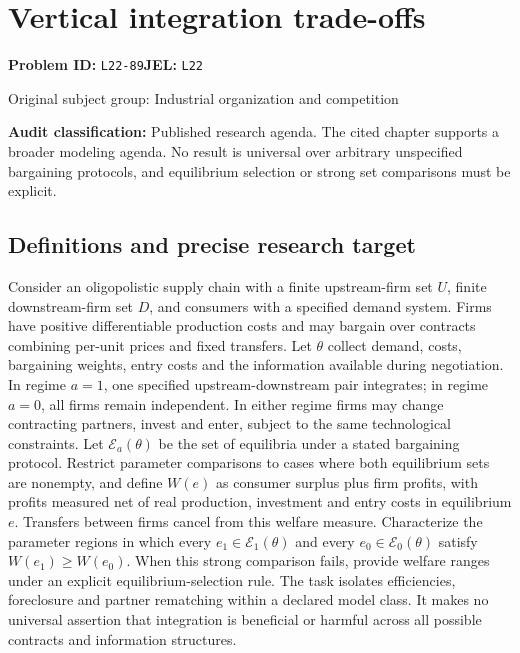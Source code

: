 \documentclass[11pt,a4paper]{article}
\begin{document}
\section*{Vertical integration trade-offs}
\textbf{Problem ID:} \texttt{L22-89}\quad \textbf{JEL:} \texttt{L22}\par
\label{problem:OP-0396}
{\sffamily\small\color{muted}Original subject group: Industrial organization and competition\par}
\label{definitions:problem:30007678}
\textbf{Audit classification:} Published research agenda. The cited chapter supports a broader modeling agenda. No result is universal over arbitrary unspecified bargaining protocols, and equilibrium selection or strong set comparisons must be explicit.
\subsection*{Definitions and precise research target}
Consider an oligopolistic supply chain with a finite upstream-firm set \(U\), finite downstream-firm set \(D\), and consumers with a specified demand system. Firms have positive differentiable production costs and may bargain over contracts combining per-unit prices and fixed transfers. Let \(\theta\) collect demand, costs, bargaining weights, entry costs and the information available during negotiation. In regime \(a=1\), one specified upstream-downstream pair integrates; in regime \(a=0\), all firms remain independent. In either regime firms may change contracting partners, invest and enter, subject to the same technological constraints. Let \(\mathcal E_a(\theta)\) be the set of equilibria under a stated bargaining protocol. Restrict parameter comparisons to cases where both equilibrium sets are nonempty, and define \(W(e)\) as consumer surplus plus firm profits, with profits measured net of real production, investment and entry costs in equilibrium \(e\). Transfers between firms cancel from this welfare measure. Characterize the parameter regions in which every \(e_1\in\mathcal E_1(\theta)\) and every \(e_0\in\mathcal E_0(\theta)\) satisfy \(W(e_1)\geq W(e_0)\). When this strong comparison fails, provide welfare ranges under an explicit equilibrium-selection rule. The task isolates efficiencies, foreclosure and partner rematching within a declared model class. It makes no universal assertion that integration is beneficial or harmful across all possible contracts and information structures.
\end{document}

